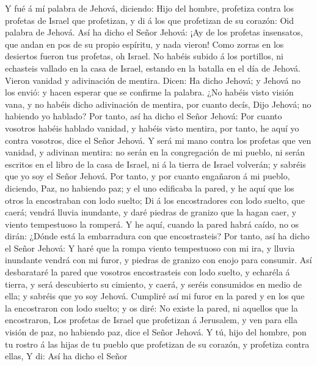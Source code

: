  Y fué á mí palabra de Jehová, diciendo: 
Hijo del hombre, profetiza contra los profetas de Israel que profetizan,
y di á los que profetizan de su corazón: Oid palabra de Jehová.
 Así ha dicho el Señor Jehová: ¡Ay de los profetas
insensatos, que andan en pos de su propio espíritu, y nada vieron!
 Como zorras en los desiertos fueron tus profetas, oh
Israel.  No habéis subido á los portillos, ni echasteis
vallado en la casa de Israel, estando en la batalla en el día de Jehová.
 Vieron vanidad y adivinación de mentira. Dicen: Ha dicho
Jehová; y Jehová no los envió: y hacen esperar que se confirme la
palabra.  ¿No habéis visto visión vana, y no habéis dicho
adivinación de mentira, por cuanto decís, Dijo Jehová; no habiendo yo
hablado?  Por tanto, así ha dicho el Señor Jehová: Por
cuanto vosotros habéis hablado vanidad, y habéis visto mentira, por
tanto, he aquí yo contra vosotros, dice el Señor Jehová. 
Y será mi mano contra los profetas que ven vanidad, y adivinan mentira:
no serán en la congregación de mi pueblo, ni serán escritos en el libro
de la casa de Israel, ni á la tierra de Israel volverán; y sabréis que
yo soy el Señor Jehová.  Por tanto, y por cuanto
engañaron á mi pueblo, diciendo, Paz, no habiendo paz; y el uno
edificaba la pared, y he aquí que los otros la encostraban con lodo
suelto;  Di á los encostradores con lodo suelto, que
caerá; vendrá lluvia inundante, y daré piedras de granizo que la hagan
caer, y viento tempestuoso la romperá.  Y he aquí, cuando
la pared habrá caído, no os dirán: ¿Dónde está la embarradura con que
encostrasteis?  Por tanto, así ha dicho el Señor Jehová:
Y haré que la rompa viento tempestuoso con mi ira, y lluvia inundante
vendrá con mi furor, y piedras de granizo con enojo para consumir.
 Así desbarataré la pared que vosotros encostrasteis con
lodo suelto, y echaréla á tierra, y será descubierto su cimiento, y
caerá, y seréis consumidos en medio de ella; y sabréis que yo soy
Jehová.  Cumpliré así mi furor en la pared y en los que
la encostraron con lodo suelto; y os diré: No existe la pared, ni
aquellos que la encostraron,  Los profetas de Israel que
profetizan á Jerusalem, y ven para ella visión de paz, no habiendo paz,
dice el Señor Jehová.  Y tú, hijo del hombre, pon tu
rostro á las hijas de tu pueblo que profetizan de su corazón, y
profetiza contra ellas,  Y di: Así ha dicho el Señor
